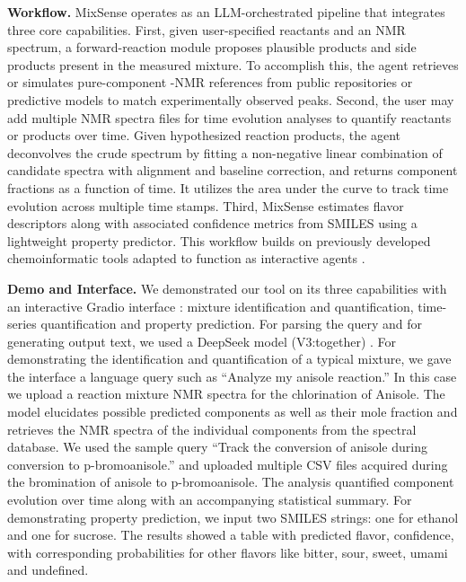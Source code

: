 \documentclass{article}
\begin{document}
\textbf{Workflow.} MixSense operates as an LLM-orchestrated pipeline that integrates three core capabilities. First, given user-specified reactants and an NMR spectrum, a forward-reaction module proposes plausible products and side products present in the measured mixture. To accomplish this, the agent retrieves or simulates pure-component -NMR references from public repositories or predictive models to match experimentally observed peaks. Second, the user may add multiple NMR spectra files for time evolution analyses to quantify reactants or products over time. Given hypothesized reaction products, the agent deconvolves the crude spectrum by fitting a non-negative linear combination of candidate spectra with alignment and baseline correction, and returns component fractions as a function of time. It utilizes the area under the curve to track time evolution across multiple time stamps. Third, MixSense estimates flavor descriptors along with associated confidence metrics from SMILES using a lightweight property predictor. This workflow builds on previously developed chemoinformatic tools adapted to function as interactive agents \cite{2025zimmermann, domzal2024magnetstein, kuhn2024twenty, wang2025nmrextractor, sagawa2025reactiont5}.

\textbf{Demo and Interface.} We demonstrated our tool on its three capabilities with an interactive Gradio interface \cite{gradio}: mixture identification and quantification, time-series quantification and property prediction. For parsing the query and for generating output text, we used a DeepSeek model (V3:together) \cite{deepseek}. For demonstrating the identification and quantification of a typical mixture, we gave the interface a language query such as ``Analyze my anisole reaction.'' In this case we upload a reaction mixture NMR spectra for the chlorination of Anisole. The model elucidates possible predicted components as well as their mole fraction and retrieves the NMR spectra of the individual components from the spectral database. We used the sample query ``Track the conversion of anisole during conversion to p-bromoanisole.'' and uploaded multiple CSV files acquired during the bromination of anisole to p-bromoanisole. The analysis quantified component evolution over time along with an accompanying statistical summary. For demonstrating property prediction, we input two SMILES strings: one for ethanol and one for sucrose. The results showed a table with predicted flavor, confidence, with corresponding probabilities for other flavors like bitter, sour, sweet, umami and undefined.
\end{document}
